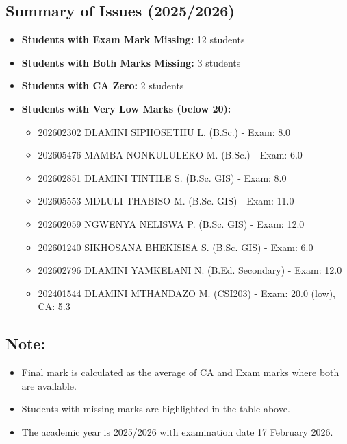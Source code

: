 \documentclass[12pt]{article}
\begin{document}
\subsection*{Summary of Issues (2025/2026)}
\begin{itemize}
    \item \textbf{Students with Exam Mark Missing:} 12 students
    \item \textbf{Students with Both Marks Missing:} 3 students
    \item \textbf{Students with CA Zero:} 2 students
    \item \textbf{Students with Very Low Marks (below 20):}
    \begin{itemize}
        \item 202602302 DLAMINI SIPHOSETHU L. (B.Sc.) - Exam: 8.0
        \item 202605476 MAMBA NONKULULEKO M. (B.Sc.) - Exam: 6.0
        \item 202602851 DLAMINI TINTILE S. (B.Sc. GIS) - Exam: 8.0
        \item 202605553 MDLULI THABISO M. (B.Sc. GIS) - Exam: 11.0
        \item 202602059 NGWENYA NELISWA P. (B.Sc. GIS) - Exam: 12.0
        \item 202601240 SIKHOSANA BHEKISISA S. (B.Sc. GIS) - Exam: 6.0
        \item 202602796 DLAMINI YAMKELANI N. (B.Ed. Secondary) - Exam: 12.0
        \item 202401544 DLAMINI MTHANDAZO M. (CSI203) - Exam: 20.0 (low), CA: 5.3
    \end{itemize}
\end{itemize}

\subsection*{Note:}
\begin{itemize}
    \item Final mark is calculated as the average of CA and Exam marks where both are available.
    \item Students with missing marks are highlighted in the table above.
    \item The academic year is 2025/2026 with examination date 17 February 2026.
\end{itemize}
\end{document}
